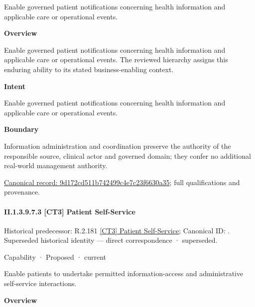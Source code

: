 Enable governed patient notifications concerning health information and applicable care or operational events.



\textbf{Overview}



Enable governed patient notifications concerning health information and applicable care or operational events. The reviewed hierarchy assigns this enduring ability to its stated business-enabling context.



\textbf{Intent}



Enable governed patient notifications concerning health information and applicable care or operational events.



\textbf{Boundary}



Information administration and coordination preserve the authority of the responsible source, clinical actor and governed domain; they confer no additional real-world management authority.


{\footnotesize \href{../../../../../../../continuum/strategy/capability/9d172cd511b742499c4e7c23f6630a35.md}{Canonical record: 9d172cd511b742499c4e7c23f6630a35}; full qualifications and provenance.}\par
\paragraph*{II.1.3.9.7.3 [CT3] Patient Self-Service}
\label{navigation:II.1.3.9.7.3}

{\small Historical predecessor: R.2.181 \hyperref[element:60f427e6b5764757b909624085a2af89]{[CT3] Patient Self-Service}; Canonical ID: \texttt{}. Superseded historical identity — direct correspondence · superseded.}\par
\label{element:d4956cab8b2b46c396899949c9486a1c}
{\small Capability · Proposed · current}\par

Enable patients to undertake permitted information-access and administrative self-service interactions.



\textbf{Overview}



